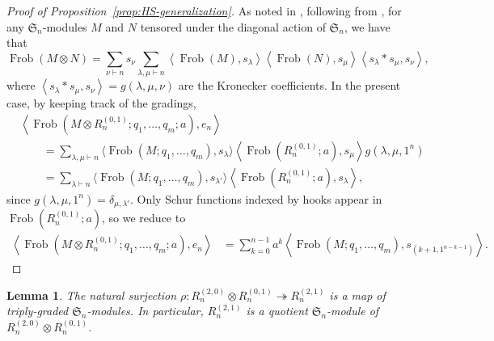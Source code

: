 \documentclass[11pt, noadjust, reqno]{amsart}
\newtheorem{lemma}[theorem]{Lemma}
\theoremstyle{definition}
\theoremstyle{remark}
\numberwithin{equation}{section}
\newcommand{\0}{\emptyset}
\renewcommand{\S}{\mathfrak{S}}
\DeclareMathOperator{\Frob}{Frob}
\begin{document}
\begin{proof}[Proof of Proposition~\ref{prop:HS-generalization}]
    As noted in \cite[Equation (4.9)]{HaglundSergel}, following from \cite{Bessenrodt}, for any $\mathfrak{S}_n$-modules $M$ and $N$ tensored under the diagonal action of $\mathfrak{S}_n$, we have that
    \begin{equation*} \Frob(M \otimes N) = \sum_{\nu \vdash n} s_\nu \sum_{\lambda, \mu \vdash n} \left\langle \Frob(M), s_\lambda \right\rangle \left\langle \Frob(N), s_\mu \right\rangle \left\langle s_\lambda * s_\mu, s_\nu \right\rangle,
    \end{equation*}
    where $\left\langle s_\lambda * s_\mu, s_\nu \right\rangle = g(\lambda, \mu, \nu)$ are the Kronecker coefficients. 
    In the present case, by keeping track of the gradings,
    \begin{equation*}
    \begin{aligned} 
    &\left\langle \Frob(M \otimes R_n^{(0,1)}; q_1,\ldots,q_m;a), e_n\right\rangle\\ 
    &\qquad=  \sum_{\lambda, \mu \vdash n} \Big\langle \Frob(M;q_1,\ldots,q_m), s_\lambda \Big\rangle \left\langle \Frob(R_n^{(0,1)};a), s_\mu \right\rangle g(\lambda, \mu, 1^n)  \\
    &\qquad=  \sum_{\lambda \vdash n} \Big\langle \Frob(M;q_1,\ldots,q_m), s_{\lambda'} \Big\rangle \left\langle \Frob(R_n^{(0,1)};a), s_{\lambda} \right\rangle,
    \end{aligned}
    \end{equation*}
    since $g(\lambda, \mu, 1^n) = \delta_{\mu, \lambda'}$.  
    Only Schur functions indexed by hooks appear in $\Frob(R_n^{(0,1)};a)$, so we reduce to
    \begin{equation*}
    \begin{aligned} \left\langle \Frob(M \otimes R_n^{(0,1)}; q_1,\ldots,q_m;a),e_n\right\rangle 
    &=  \sum_{k=0}^{n-1} a^k \left\langle \Frob(M;q_1,\ldots,q_m), s_{(k+1,1^{n-k-1})} \right\rangle. 
    \end{aligned}
    \end{equation*}
\end{proof}

\begin{lemma}\label{lem:quotient}
The natural surjection $\rho: R_n^{(2,0)} \otimes R_n^{(0,1)} \twoheadrightarrow R_n^{(2,1)}$ is a map of triply-graded $\S_n$-modules.
In particular, $R_n^{(2,1)}$ is a quotient $\mathfrak{S}_n$-module of $R_n^{(2,0)} \otimes R_n^{(0,1)}$.
\end{lemma}
\end{document}
